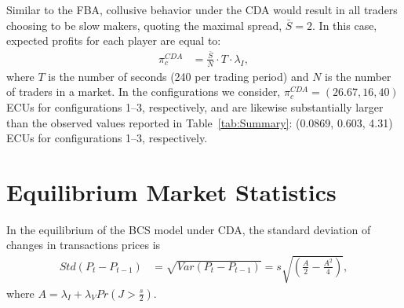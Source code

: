 \documentclass[12pt]{article}
\begin{document}
\begin{appendices}
Similar to the FBA, collusive behavior under the CDA would result in all traders choosing to be slow makers, quoting the maximal spread, $\bar{S} = 2$.
In this case, expected profits for each player are equal to:
\begin{align}
\pi_{c}^{CDA} & = \frac{\bar{S}}{N} \cdot T \cdot \lambda_I, 
\end{align}
where $T$ is the number of seconds (240 per trading period) and $N$ is the number of traders in a market. In the configurations we consider, $\pi_{c}^{CDA} = (26.67, 16, 40)$ ECUs for configurations 1--3, respectively, and are likewise substantially larger than the observed values reported in Table~\ref{tab:Summary}: (0.0869, 0.603, 4.31) ECUs for configurations 1--3, respectively.

\newpage

\section{Equilibrium Market Statistics}
\label{marketStats}

\begin{proposition} \label{stdDeltaPCDA}
In the equilibrium of the BCS model under CDA, the standard deviation of changes in transactions prices is
\begin{align}
Std(P_t-P_{t-1}) & = \sqrt{Var\left(P_{t}-P_{t-1}\right)}  = s \sqrt{\left(\frac{A}{2}-\frac{A^{2}}{4}\right)}, \label{dPCDA}
\end{align}
where $A=\lambda_{I}+\lambda_{V}Pr(J>\frac{s}{2})$.
\end{proposition}


\end{appendices}
\end{document}
